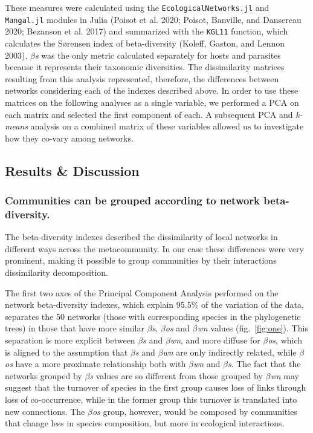 \documentclass[12pt]{article}
\begin{document}
These measures were calculated using the \texttt{EcologicalNetworks.jl}
and \texttt{Mangal.jl} modules in Julia (Poisot et al. 2020; Poisot,
Banville, and Dansereau 2020; Bezanson et al. 2017) and summarized with
the \texttt{KGL11} function, which calculates the Sørensen index of
beta-diversity (Koleff, Gaston, and Lennon 2003). \emph{\(\beta\)s} was
the only metric calculated separately for hosts and parasites because it
represents their taxonomic diversities. The dissimilarity matrices
resulting from this analysis represented, therefore, the differences
between networks considering each of the indexes described above. In
order to use these matrices on the following analyses as a single
variable, we performed a PCA on each matrix and selected the first
component of each. A subsequent PCA and \emph{k-means} analysis on a
combined matrix of these variables allowed us to investigate how they
co-vary among networks.

\hypertarget{results-discussion}{%
\subsection{Results \& Discussion}\label{results-discussion}}

\hypertarget{communities-can-be-grouped-according-to-network-beta-diversity.}{%
\subsubsection{Communities can be grouped according to network
beta-diversity.}\label{communities-can-be-grouped-according-to-network-beta-diversity.}}

The beta-diversity indexes described the dissimilarity of local networks
in different ways across the metacommunity. In our case these
differences were very prominent, making it possible to group communities
by their interactions dissimilarity decomposition.

The first two axes of the Principal Component Analysis performed on the
network beta-diversity indexes, which explain 95.5\% of the variation of
the data, separates the 50 networks (those with corresponding species in
the phylogenetic trees) in those that have more similar
\emph{\(\beta\)s}, \emph{\(\beta\)os} and \emph{\(\beta\)wn} values
(fig.~\ref{fig:one}). This separation is more explicit between
\emph{\(\beta\)s} and \emph{\(\beta\)wn}, and more diffuse for
\emph{\(\beta\)os}, which is aligned to the assumption that
\emph{\(\beta\)s} and \emph{\(\beta\)wn} are only indirectly related,
while \emph{\(\beta\)os} have a more proximate relationship both with
\emph{\(\beta\)wn} and \emph{\(\beta\)s}. The fact that the networks
grouped by \emph{\(\beta\)s} values are so different from those grouped
by \emph{\(\beta\)wn} may suggest that the turnover of species in the
first group causes loss of links through loss of co-occurrence, while in
the former group this turnover is translated into new connections. The
\emph{\(\beta\)os} group, however, would be composed by communities that
change less in species composition, but more in ecological interactions.
\end{document}
